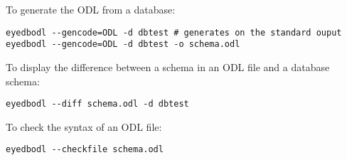 To generate the ODL from a database:
\vspace{-2mm}
\begin{verbatim}
eyedbodl --gencode=ODL -d dbtest # generates on the standard ouput
eyedbodl --gencode=ODL -d dbtest -o schema.odl
\end{verbatim}

To display the difference between a schema in an ODL file and a database
schema:
\vspace{-2mm}
\begin{verbatim}
eyedbodl --diff schema.odl -d dbtest
\end{verbatim}

To check the syntax of an ODL file:
\vspace{-2mm}
\begin{verbatim}
eyedbodl --checkfile schema.odl
\end{verbatim}

